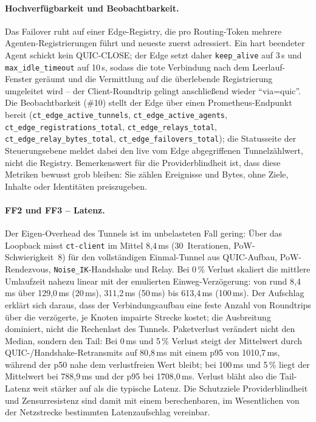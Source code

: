 \paragraph{Hochverfügbarkeit und Beobachtbarkeit.} Das Failover ruht auf einer
Edge-Registry, die pro Routing-Token mehrere Agenten-Registrierungen führt und
neueste zuerst adressiert. Ein hart beendeter Agent schickt kein QUIC-CLOSE; der
Edge setzt daher \texttt{keep\_alive} auf 3\,s und \texttt{max\_idle\_timeout}
auf 10\,s, sodass die tote Verbindung nach dem Leerlauf-Fenster geräumt und die
Vermittlung auf die überlebende Registrierung umgeleitet wird -- der Client-Roundtrip
gelingt anschließend wieder \enquote{via=quic}. Die Beobachtbarkeit (\#10) stellt
der Edge über einen Prometheus-Endpunkt bereit
(\texttt{ct\_edge\_active\_tunnels}, \texttt{ct\_edge\_active\_agents},
\texttt{ct\_edge\_registrations\_total}, \texttt{ct\_edge\_relays\_total},
\texttt{ct\_edge\_relay\_bytes\_total}, \texttt{ct\_edge\_failovers\_total}); die
Statusseite der Steuerungsebene meldet dabei den live vom Edge abgegriffenen
Tunnelzählwert, nicht die Registry. Bemerkenswert für die Providerblindheit ist,
dass diese Metriken bewusst grob bleiben: Sie zählen Ereignisse und Bytes, ohne
Ziele, Inhalte oder Identitäten preiszugeben.

\paragraph{FF2 und FF3 -- Latenz.} Der Eigen-Overhead des Tunnels ist im
unbelasteten Fall gering: Über das Loopback misst \texttt{ct-client} im
Mittel 8{,}4\,ms (30~Iterationen, PoW-Schwierigkeit~8) für den vollständigen
Einmal-Tunnel aus QUIC-Aufbau, PoW-Rendezvous, \texttt{Noise\_IK}-Handshake und
Relay. Bei 0\,\% Verlust skaliert die mittlere Umlaufzeit nahezu linear mit der
emulierten Einweg-Verzögerung: von rund 8{,}4\,ms über 129{,}0\,ms (20\,ms),
311{,}2\,ms (50\,ms) bis 613{,}4\,ms (100\,ms). Der Aufschlag erklärt sich daraus,
dass der Verbindungsaufbau eine feste Anzahl von Roundtrips über die verzögerte,
je Knoten impairte Strecke kostet; die Ausbreitung dominiert, nicht die
Rechenlast des Tunnels. Paketverlust verändert nicht den Median, sondern den
Tail: Bei 0\,ms und 5\,\% Verlust steigt der Mittelwert durch
QUIC-/Handshake-Retransmits auf 80{,}8\,ms mit einem p95 von 1010{,}7\,ms,
während der p50 nahe dem verlustfreien Wert bleibt; bei 100\,ms und 5\,\% liegt
der Mittelwert bei 788{,}9\,ms und der p95 bei 1708{,}0\,ms. Verlust bläht also
die Tail-Latenz weit stärker auf als die typische Latenz. Die Schutzziele
Providerblindheit und Zensurresistenz sind damit mit einem berechenbaren, im
Wesentlichen von der Netzstrecke bestimmten Latenzaufschlag vereinbar.


